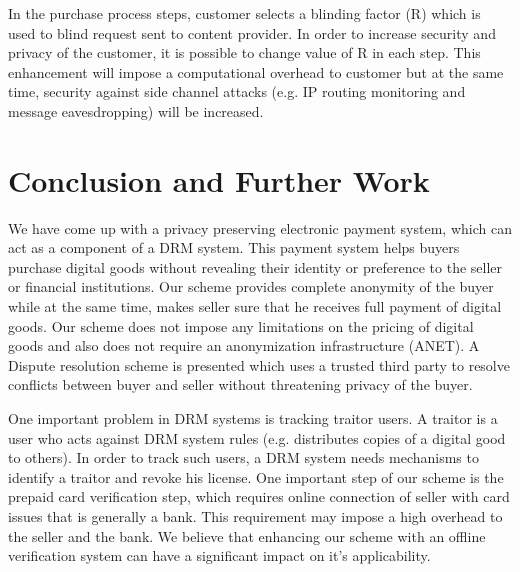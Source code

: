 \documentclass[times]{secauth}
\begin{document}
In the purchase process steps, customer selects a blinding factor (R) which is used to blind request sent to content provider. In order to increase security and privacy of the customer, it is possible to change value of R in each step. This enhancement will impose a computational overhead to customer but at the same time, security against side channel attacks (e.g. IP routing monitoring and message eavesdropping) will be increased.


\section{Conclusion and Further Work}
\label{sec:conclusion}
We have come up with a privacy preserving electronic payment system, which can act as a component of a DRM system. This payment system helps buyers purchase digital goods without revealing their identity or preference to the seller or financial institutions. Our scheme provides complete anonymity of the buyer while at the same time, makes seller sure that he receives full payment of digital goods. Our scheme does not impose any limitations on the pricing of digital goods and also does not require an anonymization infrastructure (ANET). A Dispute resolution scheme is presented which uses a trusted third party to resolve conflicts between buyer and seller without threatening privacy of the buyer.
\par One important problem in DRM systems is tracking traitor users. A traitor is a user who acts against DRM system rules (e.g. distributes copies of a digital good to others). In order to track such users, a DRM system needs mechanisms to identify a traitor and revoke his license. 
One important step of our scheme is the prepaid card verification step, which requires online connection of seller with card issues that is generally a bank. This requirement may impose a high overhead to the seller and the bank. We believe that enhancing our scheme with an offline verification system can have a significant impact on it's applicability.




\end{document}
